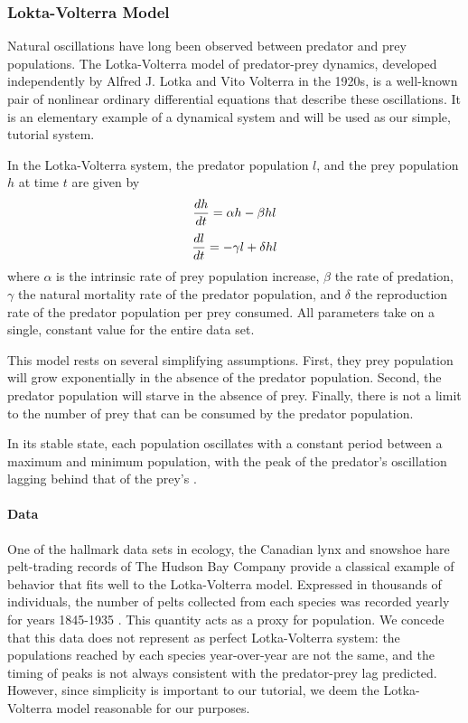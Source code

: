 \subsubsection{Lokta-Volterra Model} \label{Lotka_Volterra_System}
Natural oscillations have long been observed between predator and prey populations. The Lotka-Volterra model of predator-prey dynamics, developed independently by Alfred J. Lotka and Vito Volterra in the 1920s, is a well-known pair of nonlinear ordinary differential equations that describe these oscillations. It is an elementary example of a dynamical system and will be used as our simple, tutorial system.
\par In the Lotka-Volterra system, the predator population $l$, and the prey population $h$ at time $t$ are given by
\begin{equation} \label{eq:1prob}
\frac{dh}{dt} = \alpha h - \beta hl  \\
\end{equation}
\begin{equation} \label{eq:2prob}
\frac{dl}{dt} = -\gamma l + \delta hl \\
\end{equation}
where $\alpha$ is the intrinsic rate of prey population increase, $\beta$ the rate of predation, $\gamma$ the natural mortality rate of the predator population, and $\delta$ the reproduction rate of the predator population per prey consumed. All parameters take on a single, constant value for the entire data set.
\par This model rests on several simplifying assumptions. First, they prey population will grow exponentially in the absence of the predator population. Second, the predator population will starve in the absence of prey. Finally, there is not a limit to the number of prey that can be consumed by the predator population.
\par In its stable state, each population oscillates with a constant period between a maximum and minimum population, with the peak of the predator's oscillation lagging behind that of the prey's \cite{Lotka} \cite{Volterra}. 

\paragraph{Data}
One of the hallmark data sets in ecology, the Canadian lynx and snowshoe hare pelt-trading records of The Hudson Bay Company provide a classical example of behavior that fits well to the Lotka-Volterra model. Expressed in thousands of individuals, the number of pelts collected from each species was recorded yearly for years 1845-1935 \cite{predpreyHudsonBay}. This quantity acts as a proxy for population. We concede that this data does not represent as perfect Lotka-Volterra system: the populations reached by each species year-over-year are not the same, and the timing of peaks is not always consistent with the predator-prey lag predicted. However, since simplicity is important to our tutorial, we deem the Lotka-Volterra model reasonable for our purposes. 

